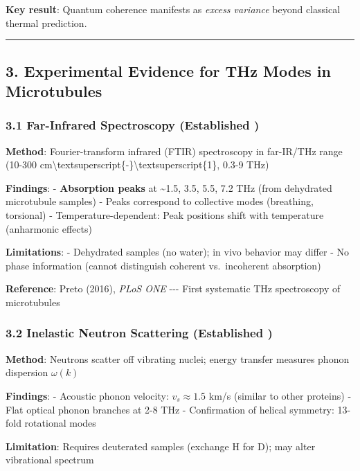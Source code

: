 \textbf{Key result}: Quantum coherence manifests as \emph{excess
variance} beyond classical thermal prediction.

\begin{center}\rule{0.5\linewidth}{0.5pt}\end{center}

\subsection{3. Experimental Evidence for THz Modes in
Microtubules}\label{experimental-evidence-for-thz-modes-in-microtubules}

\subsubsection{3.1 Far-Infrared Spectroscopy (Established
)}\label{far-infrared-spectroscopy-established}

\textbf{Method}: Fourier-transform infrared (FTIR) spectroscopy in
far-IR/THz range (10-300
cm\textbackslash textsuperscript\{-\}\textbackslash textsuperscript\{1\},
0.3-9 THz)

\textbf{Findings}: - \textbf{Absorption peaks} at \textasciitilde1.5,
3.5, 5.5, 7.2 THz (from dehydrated microtubule samples) - Peaks
correspond to collective modes (breathing, torsional) -
Temperature-dependent: Peak positions shift with temperature (anharmonic
effects)

\textbf{Limitations}: - Dehydrated samples (no water); in vivo behavior
may differ - No phase information (cannot distinguish coherent
vs.~incoherent absorption)

\textbf{Reference}: Preto (2016), \emph{PLoS ONE} -\/-\/- First
systematic THz spectroscopy of microtubules

\subsubsection{3.2 Inelastic Neutron Scattering (Established
)}\label{inelastic-neutron-scattering-established}

\textbf{Method}: Neutrons scatter off vibrating nuclei; energy transfer
measures phonon dispersion \(\omega(k)\)

\textbf{Findings}: - Acoustic phonon velocity: \(v_s \approx 1.5\) km/s
(similar to other proteins) - Flat optical phonon branches at 2-8 THz -
Confirmation of helical symmetry: 13-fold rotational modes

\textbf{Limitation}: Requires deuterated samples (exchange H for D); may
alter vibrational spectrum

